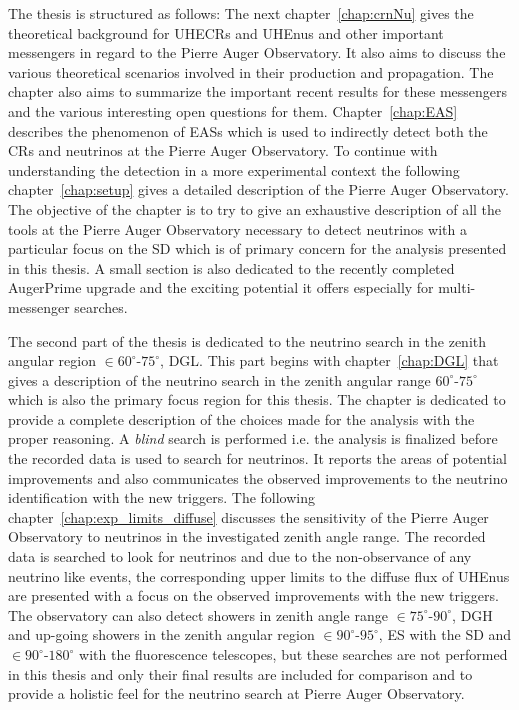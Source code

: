 The thesis is structured as follows: The next chapter~\ref{chap:crnNu} gives the theoretical background for \glspl{UHECR} and \glspl{UHEnu} and other important messengers in regard to the Pierre Auger Observatory. It also aims to discuss the various theoretical scenarios involved in their production and propagation. The chapter also aims to summarize the important recent results for these messengers and the various interesting open questions for them. Chapter~\ref{chap:EAS} describes the phenomenon of \glspl{EAS} which is used to indirectly detect both the \glspl{CR} and neutrinos at the Pierre Auger Observatory. To continue with understanding the detection in a more experimental context the following chapter~\ref{chap:setup} gives a detailed description of the Pierre Auger Observatory. The objective of the chapter is to try to give an exhaustive description of all the tools at the Pierre Auger Observatory necessary to detect neutrinos with a particular focus on the \gls{SD} which is of primary concern for the analysis presented in this thesis. A small section is also dedicated to the recently completed AugerPrime upgrade and the exciting potential it offers especially for multi-messenger searches. 

The second part of the thesis is dedicated to the neutrino search in the zenith angular region $ \in 60^\circ$-$75^\circ$, \gls{DGL}. This part begins with chapter~\ref{chap:DGL} that gives a description of the neutrino search in the zenith angular range $60^\circ$-$75^\circ$ which is also the primary focus region for this thesis. The chapter is dedicated to provide a complete description of the choices made for the analysis with the proper reasoning. A \textit{blind} search is performed i.e. the analysis is finalized before the recorded data is used to search for neutrinos. It reports the areas of potential improvements and also communicates the observed improvements to the neutrino identification with the new triggers. The following chapter~\ref{chap:exp_limits_diffuse} discusses the sensitivity of the Pierre Auger Observatory to neutrinos in the investigated zenith angle range. The recorded data is searched to look for neutrinos and due to the non-observance of any neutrino like events, the corresponding upper limits to the diffuse flux of \glspl{UHEnu} are presented with a focus on the observed improvements with the new triggers. The observatory can also detect showers in zenith angle range $\in 75^\circ$-$90^\circ$, \gls{DGH} and up-going showers in the zenith angular region $ \in 90^\circ$-$95^\circ$, \gls{ES} with the \gls{SD} and $\in 90^\circ$-$180^\circ$ with the fluorescence telescopes, but these searches are not performed in this thesis and only their final results are included for comparison and to provide a holistic feel for the neutrino search at Pierre Auger Observatory.

